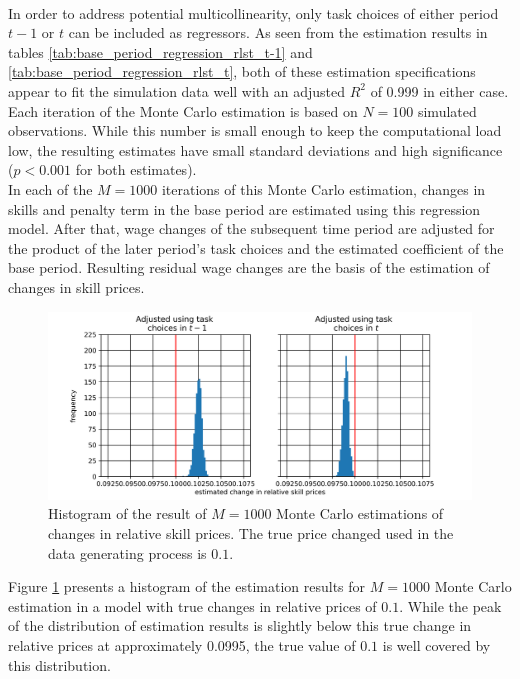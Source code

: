 \documentclass[../main.tex]{subfiles}
\begin{document}
\\
In order to address potential multicollinearity, only task choices of either period $t-1$ or $t$ can be included as regressors. As seen from the estimation results in tables \ref{tab:base_period_regression_rlst_t-1} and \ref{tab:base_period_regression_rlst_t}, both of these estimation specifications appear to fit the simulation data well with an adjusted $R^2$ of 0.999 in either case. Each iteration of the Monte Carlo estimation is based on $N=100$ simulated observations. While this number is small enough to keep the computational load low, the resulting estimates have small standard deviations and high significance ($p<0.001$ for both estimates).
\\
In each of the $M=1000$ iterations of this Monte Carlo estimation, changes in skills and penalty term in the base period are estimated using this regression model. After that, wage changes of the subsequent time period are adjusted for the product of the later period's task choices and the estimated coefficient of the base period. Resulting residual wage changes are the basis of the estimation of changes in skill prices.
\\
\begin{figure}[!htbp]
	\centering
	\includegraphics[scale=0.7]{../FIG/MC_estimation_rslt.png} 
	\caption{Histogram of the result of $M=1000$ Monte Carlo estimations of changes in relative skill prices. The true price changed used in the data generating process is $0.1$.}
	\label{fig:MC_est_rslt}
\end{figure}
Figure \ref{fig:MC_est_rslt} presents a histogram of the estimation results for $M=1000$ Monte Carlo estimation in a model with true changes in relative prices of $0.1$. While the peak of the distribution of estimation results is slightly below this true change in relative prices at approximately 0.0995, the true value of $0.1$ is well covered by this distribution.
\end{document}
